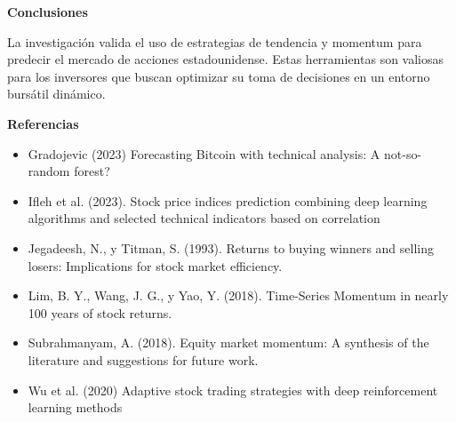 \documentclass[a0,portrait]{a0poster}
\newcommand{\customsection}[1]{
    \begin{center}
        \begin{tcolorbox}[colframe=miRojo!50, colback=miRojo, width=\linewidth, boxrule=1mm, arc=3mm, auto outer arc]
            \centering
            \vspace{.5cm} %
            \color{white}
            \textbf{\Huge #1}
            \color{miRojo}
            \vspace{.5cm} %
        \end{tcolorbox}
    \end{center}
}
\begin{document}
\begin{multicols}{2}
\begin{minipage}{\linewidth}
    \end{minipage}
    \customsection{Conclusiones}
    \par
    \indent La investigación valida el uso de estrategias de tendencia y momentum para predecir el mercado de acciones 
    estadounidense. Estas herramientas son valiosas para los inversores que buscan optimizar su toma de decisiones en un 
    entorno bursátil dinámico. 
    \customsection{Referencias}
    \par
         \begin{itemize}
            \item Gradojevic (2023) Forecasting Bitcoin with technical analysis: A not-so-random forest?
            \item Ifleh et al. (2023). Stock price indices prediction combining deep learning algorithms and selected technical 
            indicators based on correlation
            \item Jegadeesh, N., y Titman, S. (1993). Returns to buying winners and selling losers: Implications for stock 
            market efficiency.
            \item Lim, B. Y., Wang, J. G., y Yao, Y. (2018). Time-Series Momentum in nearly 100 years of stock returns.            
            \item Subrahmanyam, A. (2018). Equity market momentum: A synthesis of the literature and suggestions for future work.
            \item Wu et al. (2020) Adaptive stock trading strategies with deep reinforcement learning methods
        \end{itemize}
        
    
    
    
    
\end{multicols}
\end{document}
